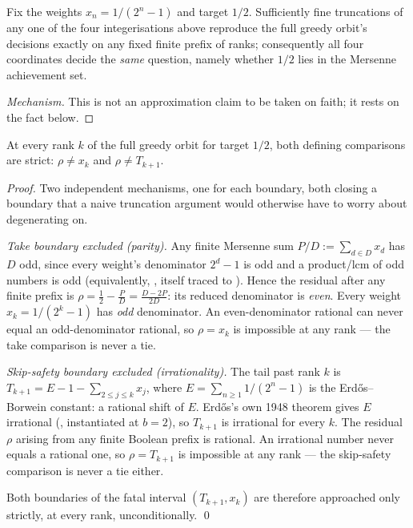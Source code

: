\begin{prop}
\label{prop:one-orbit}
Fix the weights $x_n=1/(2^n-1)$ and target $1/2$. Sufficiently fine truncations of any one of the
four integerisations above reproduce the full greedy orbit's decisions exactly on any fixed finite
prefix of ranks; consequently all four coordinates decide the \emph{same} question, namely whether
$1/2$ lies in the Mersenne achievement set.
\end{prop}
\begin{proof}[Mechanism]
This is not an approximation claim to be taken on faith; it rests on the fact below.
\end{proof}
\begin{lem}
\label{lem:no-ties}
At every rank $k$ of the full greedy orbit for target $1/2$, both defining comparisons are strict:
$\rho\ne x_k$ and $\rho\ne T_{k+1}$.
\end{lem}
\begin{proof}
Two independent mechanisms, one for each boundary, both closing a boundary that a naive
truncation argument would otherwise have to worry about degenerating on.

\emph{Take boundary excluded (parity).} Any finite Mersenne sum $P/D:=\sum_{d\in D}x_d$ has $D$
odd, since every weight's denominator $2^d-1$ is odd and a product/lcm of odd numbers is odd
(equivalently, , itself
traced to ). Hence the residual
after any finite prefix is $\rho=\tfrac12-\tfrac{P}{D}=\tfrac{D-2P}{2D}$: its reduced denominator
is \emph{even}. Every weight $x_k=1/(2^k-1)$ has \emph{odd} denominator. An even-denominator
rational can never equal an odd-denominator rational, so $\rho=x_k$ is impossible at any rank —
the take comparison is never a tie.

\emph{Skip-safety boundary excluded (irrationality).} The tail past rank $k$ is
$T_{k+1}=E-1-\sum_{2\le j\le k}x_j$, where $E=\sum_{n\ge1}1/(2^n-1)$ is the Erdős--Borwein
constant: a rational shift of $E$. Erdős's own 1948 theorem gives $E$ irrational
(, instantiated at $b=2$), so
$T_{k+1}$ is irrational for every $k$. The residual $\rho$ arising from any finite Boolean prefix
is rational. An irrational number never equals a rational one, so $\rho=T_{k+1}$ is impossible at
any rank — the skip-safety comparison is never a tie either.

Both boundaries of the fatal interval $(T_{k+1},x_k)$ are therefore approached only strictly, at
every rank, unconditionally. \qed
\end{proof}
